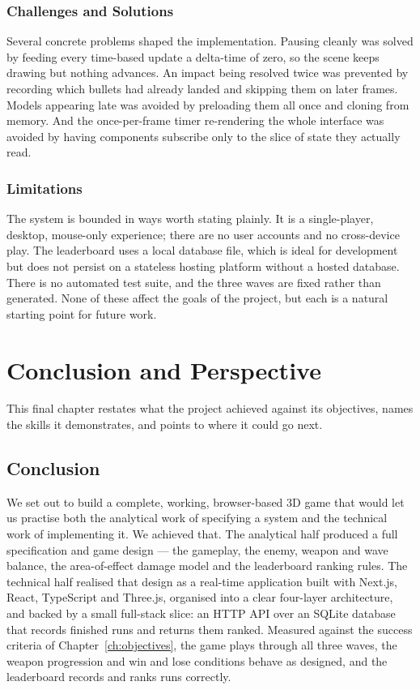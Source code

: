 \documentclass[12pt,a4paper]{report}
\begin{document}
\subsection{Challenges and Solutions}

Several concrete problems shaped the implementation. Pausing cleanly was solved
by feeding every time-based update a delta-time of zero, so the scene keeps
drawing but nothing advances. An impact being resolved twice was prevented by
recording which bullets had already landed and skipping them on later frames.
Models appearing late was avoided by preloading them all once and cloning from
memory. And the once-per-frame timer re-rendering the whole interface was avoided
by having components subscribe only to the slice of state they actually read.

\subsection{Limitations}

The system is bounded in ways worth stating plainly. It is a single-player,
desktop, mouse-only experience; there are no user accounts and no cross-device
play. The leaderboard uses a local database file, which is ideal for development
but does not persist on a stateless hosting platform without a hosted database.
There is no automated test suite, and the three waves are fixed rather than
generated. None of these affect the goals of the project, but each is a natural
starting point for future work.

\chapter{Conclusion and Perspective}\label{ch:conclusion}

This final chapter restates what the project achieved against its objectives,
names the skills it demonstrates, and points to where it could go next.

\section{Conclusion}

We set out to build a complete, working, browser-based 3D game that would let us
practise both the analytical work of specifying a system and the technical work
of implementing it. We achieved that. The analytical half produced a full
specification and game design --- the gameplay, the enemy, weapon and wave
balance, the area-of-effect damage model and the leaderboard ranking rules. The
technical half realised that design as a real-time application built with
Next.js, React, TypeScript and Three.js, organised into a clear four-layer
architecture, and backed by a small full-stack slice: an HTTP API over an SQLite
database that records finished runs and returns them ranked. Measured against the
success criteria of Chapter~\ref{ch:objectives}, the game plays through all three
waves, the weapon progression and win and lose conditions behave as designed, and
the leaderboard records and ranks runs correctly.
\end{document}
